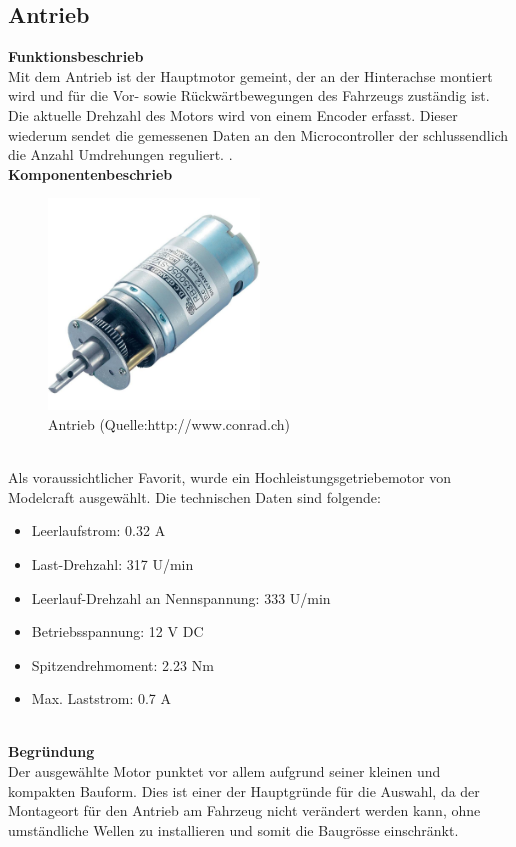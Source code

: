 \subsection{Antrieb}

\textbf{Funktionsbeschrieb}\\[0.2cm]
Mit dem Antrieb ist der Hauptmotor gemeint, der an der Hinterachse montiert wird und für die Vor- sowie Rückwärtbewegungen des Fahrzeugs zuständig ist.
Die aktuelle Drehzahl des Motors wird von einem Encoder erfasst. Dieser wiederum sendet die gemessenen Daten an den Microcontroller der schlussendlich die Anzahl Umdrehungen reguliert.
.\\[0.2cm]
\textbf{Komponentenbeschrieb}\\[0.2cm]
\begin{figure}[h]
\centering
\includegraphics[width=0.5\textwidth]{03_Loesungskonzept/pictures/antrieb.jpg}
\caption{Antrieb  (Quelle:http://www.conrad.ch)}	
\end{figure}\\[0.2cm]
Als voraussichtlicher Favorit, wurde ein Hochleistungsgetriebemotor von Modelcraft ausgewählt. Die technischen Daten sind folgende:
\begin{itemize}
\item Leerlaufstrom: 0.32 A
\item Last-Drehzahl: 317 U/min
\item Leerlauf-Drehzahl an Nennspannung: 333 U/min
\item Betriebsspannung: 12 V DC
\item Spitzendrehmoment: 2.23 Nm
\item Max. Laststrom: 0.7 A
\end{itemize}\\[0.2cm]
\textbf{Begründung}\\[0.2cm]
Der ausgewählte Motor punktet vor allem aufgrund seiner kleinen und kompakten Bauform. Dies ist einer der Hauptgründe für die Auswahl, da der Montageort für den Antrieb am Fahrzeug nicht verändert werden kann, ohne umständliche Wellen zu installieren und somit die Baugrösse einschränkt.
